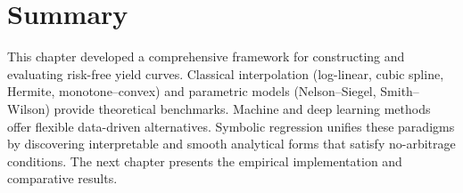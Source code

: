 \documentclass[12pt]{report}
\begin{document}
\section{Summary}

This chapter developed a comprehensive framework for constructing and evaluating risk-free yield curves.  
Classical interpolation (log-linear, cubic spline, Hermite, monotone–convex) and parametric models (Nelson–Siegel, Smith–Wilson) provide theoretical benchmarks.  
Machine and deep learning methods offer flexible data-driven alternatives.  
Symbolic regression unifies these paradigms by discovering interpretable and smooth analytical forms that satisfy no-arbitrage conditions.  
The next chapter presents the empirical implementation and comparative results.

\newpage

\printbibliography
\end{document}
